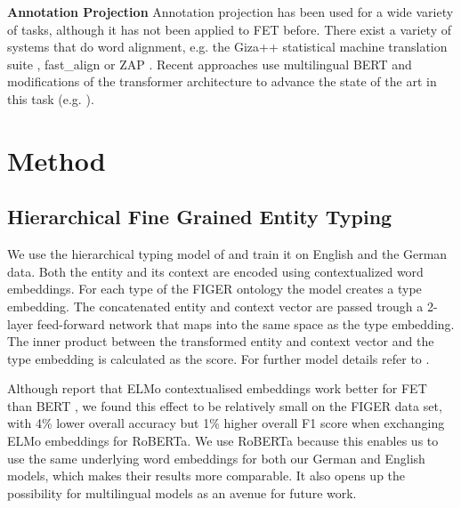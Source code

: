 \documentclass[11pt,a4paper]{article}
\begin{document}
\textbf{Annotation Projection} Annotation projection \citep{Yaro:01a} has been used for a wide variety of tasks, although it has not been applied to FET before. There exist a variety of systems that do word alignment, e.g. the Giza++ statistical machine translation suite \cite{och03:asc}, fast\_align \cite{dyer2013simple} or ZAP \cite{zap:2020}. Recent approaches use multilingual BERT and modifications of the transformer architecture to advance the state of the art in this task (e.g. \citet{nagata2020supervised, chen2020accurate}). 

\section{Method}
\subsection{Hierarchical Fine Grained Entity Typing}
We use the hierarchical typing model of \citet{ChenCD20} and train it on English and the German data. Both the entity and its context are encoded using contextualized word embeddings. For each type of the FIGER ontology the model creates a type embedding. The concatenated entity and context vector are passed trough a 2-layer feed-forward network that maps into the same space as the type embedding. The inner product between the transformed entity and context vector and the type embedding is calculated as the score. For further model details refer to \citet{ChenCD20}.

Although \citet{ChenCD20} report that ELMo contextualised embeddings \citep{Peters:2018} work better for FET than BERT \citep{devlin-etal-2019-bert}, we found this effect to be relatively small on the FIGER data set, with 4\% lower overall accuracy but 1\% higher overall F1 score when exchanging ELMo embeddings for RoBERTa\citep{conneau2019unsupervised}. We use RoBERTa because this enables us to use the same underlying word embeddings for both our German and English models, which makes their results more comparable. It also opens up the possibility for multilingual models as an avenue for future work.

\end{document}
